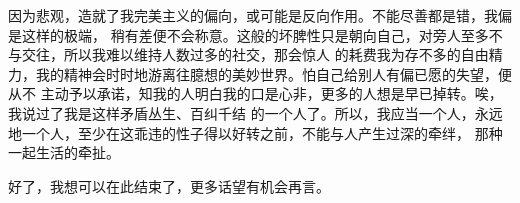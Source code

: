 \begin{adjustwidth}{2cm}{1cm}
{        \hspace*{2em} 因为悲观，造就了我完美主义的偏向，或可能是反向作用。不能尽善都是错，我偏是这样的极端，
        稍有差便不会称意。这般的坏脾性只是朝向自己，对旁人至多不与交往，所以我难以维持人数过多的社交，那会惊人
        的耗费我为存不多的自由精力，我的精神会时时地游离往臆想的美妙世界。怕自己给别人有偏已愿的失望，便从不
        主动予以承诺，知我的人明白我的口是心非，更多的人想是早已掉转。唉，我说过了我是这样矛盾丛生、百纠千结
        的一个人了。所以，我应当一个人，永远地一个人，至少在这乖违的性子得以好转之前，不能与人产生过深的牵绊，
        那种一起生活的牵扯。

        \hspace*{2em} 好了，我想可以在此结束了，更多话望有机会再言。

}
\end{adjustwidth}
\newpage